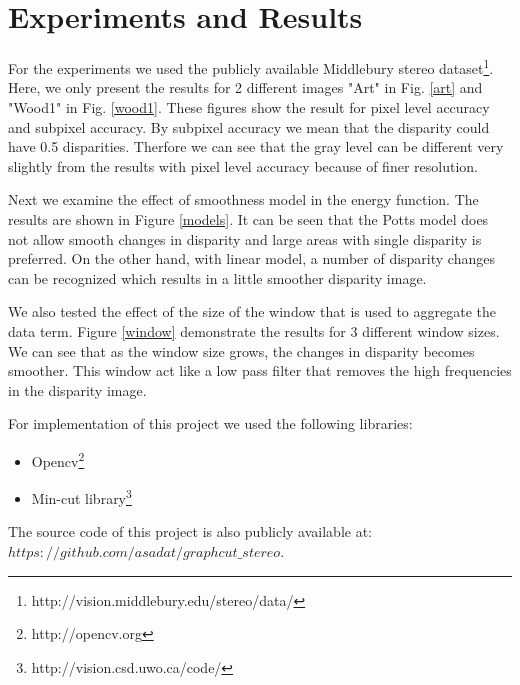 \documentclass[letterpaper, 10 pt, conference]{ieeeconf}  %
\begin{document}
\section{Experiments and Results}
\label{exper}
For the experiments we used the publicly available Middlebury stereo dataset\footnote{http://vision.middlebury.edu/stereo/data/}. Here, we only present the results for 2 different images "Art" in Fig. \ref{art} and "Wood1" in Fig. \ref{wood1}. These figures show the result for pixel level accuracy and subpixel accuracy. By subpixel accuracy we mean that the disparity could have 0.5 disparities. Therfore we can see that the gray level can be different very slightly from the results with pixel level accuracy because of finer resolution.

Next we examine the effect of smoothness model in the energy function. The results are shown in Figure \ref{models}. It can be seen that the Potts model does not allow smooth changes in disparity and large areas with single disparity is preferred. On the other hand, with linear model, a number of disparity changes can be recognized which results in a little smoother disparity image.

We also tested the effect of the size of the window that is used to aggregate the data term. Figure \ref{window} demonstrate the results for 3 different window sizes. We can see that as the window size grows, the changes in disparity becomes smoother. This window act like a low pass filter that removes the high frequencies in the disparity image.

For implementation of this project we used the following libraries:
\begin{itemize}
\item Opencv\footnote{http://opencv.org}
\item Min-cut library\footnote{http://vision.csd.uwo.ca/code/}
\end{itemize}
The source code of this project is also publicly available at: $https://github.com/asadat/graphcut\_stereo$.
\end{document}
